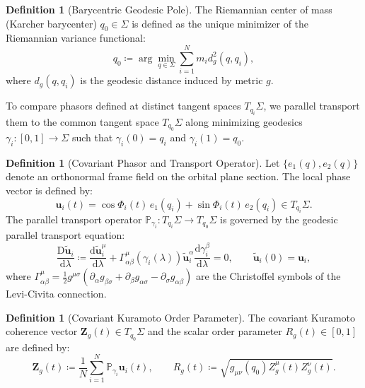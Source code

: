 \documentclass[11pt,a4paper,reqno]{article}
\theoremstyle{plain}
\theoremstyle{definition}
\newtheorem{definition}[theorem]{Definition}
\theoremstyle{remark}
\numberwithin{equation}{section}
\begin{document}
\begin{definition}[Barycentric Geodesic Pole]
The Riemannian center of mass (Karcher barycenter) $q_0 \in \Sigma$ is defined as the unique minimizer of the Riemannian variance functional:
\begin{equation}
q_0 \coloneqq \arg\min_{q \in \Sigma} \sum_{i=1}^N m_i d_g^2(q, q_i),
\label{eq:karcher_barycenter}
\end{equation}
where $d_g(q, q_i)$ is the geodesic distance induced by metric $g$.
\end{definition}

To compare phasors defined at distinct tangent spaces $T_{q_i}\Sigma$, we parallel transport them to the common tangent space $T_{q_0}\Sigma$ along minimizing geodesics $\gamma_i: [0, 1] \to \Sigma$ such that $\gamma_i(0) = q_i$ and $\gamma_i(1) = q_0$.

\begin{definition}[Covariant Phasor and Transport Operator]
Let $\{e_1(q), e_2(q)\}$ denote an orthonormal frame field on the orbital plane section. The local phase vector is defined by:
\begin{equation}
\bm{u}_i(t) = \cos \Phi_i(t) \, e_1(q_i) + \sin \Phi_i(t) \, e_2(q_i) \in T_{q_i}\Sigma.
\end{equation}
The parallel transport operator $\mathbb{P}_{\gamma_i}: T_{q_i}\Sigma \to T_{q_0}\Sigma$ is governed by the geodesic parallel transport equation:
\begin{equation}
\frac{\mathrm{D} \widetilde{\bm{u}}_i}{\mathrm{d}\lambda} \coloneqq \frac{\mathrm{d} \widetilde{\bm{u}}_i^\mu}{\mathrm{d}\lambda} + \Gamma^\mu_{\alpha\beta}(\gamma_i(\lambda)) \widetilde{\bm{u}}_i^\alpha \frac{\mathrm{d}\gamma_i^\beta}{\mathrm{d}\lambda} = 0, \qquad \widetilde{\bm{u}}_i(0) = \bm{u}_i,
\label{eq:parallel_transport}
\end{equation}
where $\Gamma^\mu_{\alpha\beta} = \frac{1}{2} g^{\mu\sigma}(\partial_\alpha g_{\beta\sigma} + \partial_\beta g_{\alpha\sigma} - \partial_\sigma g_{\alpha\beta})$ are the Christoffel symbols of the Levi-Civita connection.
\end{definition}

\begin{definition}[Covariant Kuramoto Order Parameter]
The covariant Kuramoto coherence vector $\bm{Z}_g(t) \in T_{q_0}\Sigma$ and the scalar order parameter $R_g(t) \in [0, 1]$ are defined by:
\begin{equation}
\bm{Z}_g(t) \coloneqq \frac{1}{N} \sum_{i=1}^N \mathbb{P}_{\gamma_i} \bm{u}_i(t), \qquad R_g(t) \coloneqq \sqrt{g_{\mu\nu}(q_0) Z_g^\mu(t) Z_g^\nu(t)}.
\label{eq:order_parameter}
\end{equation}
\end{definition}
\end{document}
